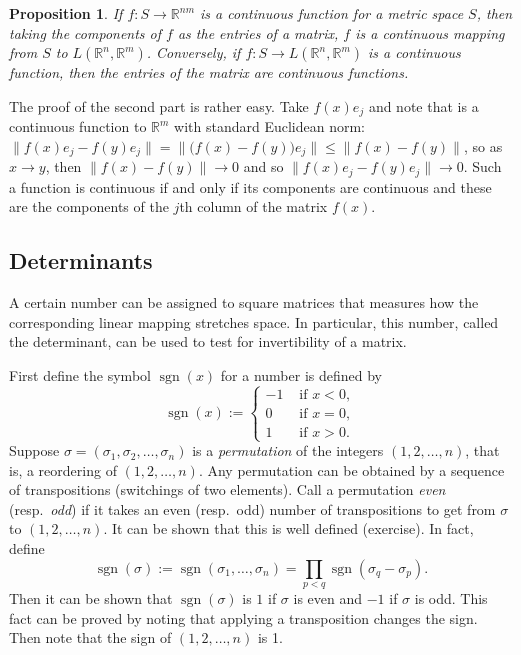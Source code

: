 \documentclass[12pt]{book}
\newcommand{\snorm}[1]{\lVert {#1} \rVert}
\newcommand{\R}{{\mathbb{R}}}
\newcommand{\myindex}[1]{#1\index{#1}}
\theoremstyle{plain}
\newtheorem{prop}[thm]{Proposition}
\theoremstyle{remark}
\theoremstyle{definition}
\theoremstyle{exercise}
\theoremstyle{example}
\begin{document}
\begin{prop}
If $f \colon S \to \R^{nm}$ is a continuous function
for a metric space $S$,
then taking the components of $f$ as the entries of a matrix,
$f$ is a continuous mapping from $S$
to $L(\R^n,\R^m)$.
Conversely, if $f \colon S \to L(\R^n,\R^m)$ is a continuous
function, then the entries of the matrix are continuous functions.
\end{prop}

The proof of the second part is rather easy.  Take $f(x) e_j$ and note 
that is a continuous function to $\R^m$ with standard Euclidean norm:
$\snorm{f(x) e_j - f(y) e_j} = 
\snorm{\bigl(f(x)- f(y) \bigr) e_j} \leq
\snorm{f(x)- f(y)}$, so as $x \to y$, then
$\snorm{f(x)- f(y)} \to 0$ and so 
$\snorm{f(x) e_j - f(y) e_j} \to 0$.
Such a
function is continuous if and only if its components are continuous
and these are the components of the $j$th column of the matrix $f(x)$.

\subsection{Determinants}

A certain number can be assigned to square matrices that measures
how the corresponding linear mapping stretches space.  In particular,
this number, called the determinant, can be used to test for invertibility of a matrix.

First define the symbol
$\operatorname{sgn}(x)$ for a number is defined by
\begin{equation*}
\operatorname{sgn}(x)
:=
\begin{cases}
-1 & \text{ if $x < 0$} , \\
0 & \text{ if $x = 0$} , \\
1 & \text{ if $x > 0$} .
\end{cases}
\end{equation*}
Suppose 
$\sigma = (\sigma_1,\sigma_2,\ldots,\sigma_n)$ is a \emph{\myindex{permutation}}
of the integers $(1,2,\ldots,n)$, that is, a reordering of $(1,2,\ldots,n)$. 
Any permutation can be obtained by
a sequence of transpositions (switchings of two elements). Call
a permutation \emph{even}
(resp.\ \emph{odd})
if it takes an even (resp.\ odd) number of
transpositions to get from $\sigma$ to $(1,2,\ldots,n)$.
It can be shown
that this is well defined (exercise).
In fact, define
\begin{equation} \label{eq:sgndef}
\operatorname{sgn}(\sigma) := \operatorname{sgn}(\sigma_1,\ldots,\sigma_n) = 
\prod_{p < q} \operatorname{sgn}(\sigma_q-\sigma_p) .
\end{equation}
Then it can be shown that $\operatorname{sgn}(\sigma)$ 
is $1$ if $\sigma$ is even and $-1$ if $\sigma$ is odd.
This fact can be proved by noting that applying a transposition changes the
sign.
Then note that the sign of $(1,2,\ldots,n)$ is 1.
\end{document}
